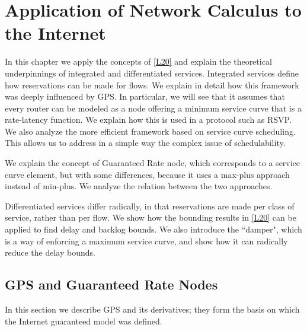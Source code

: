 \chapter[Application to the Internet]{Application of Network Calculus
 to the Internet}

In this chapter we apply the concepts of \cref{L20} and explain
the theoretical underpinnings of integrated and differentiated
services. Integrated services define how reservations can be made
for flows. We explain in detail how this framework was deeply
influenced by GPS. In particular, we will see that it assumes that
every router can be modeled as a node offering a minimum service
curve that is a rate-latency function. We explain how this is used
in a protocol such as RSVP. We also analyze  the more efficient
framework based on service curve scheduling. This allows us to
address in a simple way the complex issue of schedulability.

We explain the concept of Guaranteed Rate node, which corresponds
to a service curve element, but with some differences, because it
uses a max-plus approach instead of min-plus. We analyze the
relation between the two approaches.

Differentiated services differ radically, in that reservations are
made per class of service, rather than per flow. We show how the
bounding results in \cref{L20} can be applied to find delay and
backlog bounds. We also introduce the ``damper", which is a way of
enforcing a maximum service curve, and show how it can radically
reduce the delay bounds.

\section{GPS and Guaranteed Rate Nodes}
In this section we describe GPS and its
derivatives; they form the basis on which the Internet guaranteed
model was defined.%

